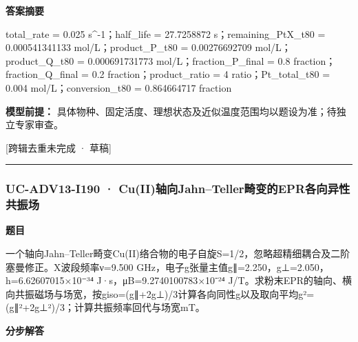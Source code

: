 \documentclass[UTF8,11pt,a4paper]{ctexart}
\begin{document}
\noindent\textbf{答案摘要}\par
total\_rate = 0.025 s\textasciicircum{}-1；half\_life = 27.7258872 s；remaining\_PtX\_t80 = 0.000541341133 mol/L；product\_P\_t80 = 0.00276692709 mol/L；product\_Q\_t80 = 0.000691731773 mol/L；fraction\_P\_final = 0.8 fraction；fraction\_Q\_final = 0.2 fraction；product\_ratio = 4 ratio；Pt\_total\_t80 = 0.004 mol/L；conversion\_t80 = 0.864664717 fraction\par
\noindent\textbf{模型前提：}
具体物种、固定活度、理想状态及近似温度范围均以题设为准；待独立专家审查。\par
\noindent\textcolor{red!65!black}{[跨辑去重未完成 · 草稿]} \par
\medskip\hrule\medskip
{}
\subsubsection*{UC-ADV13-I190 · Cu(II)轴向Jahn–Teller畸变的EPR各向异性共振场}
\noindent\textbf{题目}\par
一个轴向Jahn–Teller畸变Cu(II)络合物的电子自旋S=1/2，忽略超精细耦合及二阶塞曼修正。X波段频率ν=9.500 GHz，电子g张量主值g∥=2.250，g⊥=2.050，h=6.62607015×10⁻³⁴ J·s，μB=9.2740100783×10⁻²⁴ J/T。求粉末EPR的轴向、横向共振磁场与场宽，按giso=(g∥+2g⊥)/3计算各向同性g以及取向平均g²=(g∥²+2g⊥²)/3；计算共振频率回代与场宽mT。\par
\medskip\noindent\textbf{分步解答}
\end{document}

